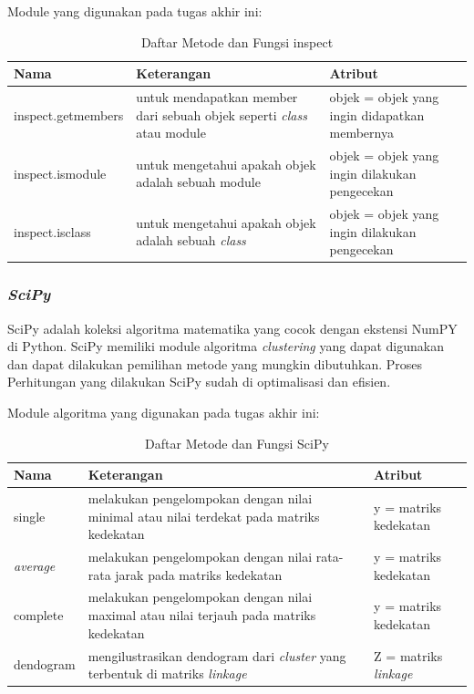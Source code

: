 Module yang digunakan pada tugas akhir ini:
\begingroup
\setlength{\LTleft}{-20cm plus -1fill}
\setlength{\LTright}{\LTleft}
\begin{small}
	\begin{longtable}{|p{3cm}|p{5cm}|p{4.5cm}|}
		\caption{Daftar Metode dan Fungsi inspect}\\
		\hline
		\textbf{Nama} & \textbf{Keterangan} & \textbf{Atribut}\\
		\endfirsthead
		
		\hline
		    inspect.getmembers
		  &  untuk mendapatkan member dari sebuah objek seperti \textit{class} atau module
		  & objek = objek yang ingin didapatkan membernya\\
		\hline 
		    inspect.ismodule
		  & untuk mengetahui apakah objek adalah sebuah module
		  & objek = objek yang ingin dilakukan pengecekan\\
		\hline  
		\hline
		    inspect.isclass
		  & untuk mengetahui apakah objek adalah sebuah \textit{class}
		  & objek = objek yang ingin dilakukan pengecekan\\
		\hline  
	\end{longtable}
\end{small}
\endgroup

\subsubsection{\textit{SciPy} \cite{scipy}}
SciPy adalah koleksi algoritma matematika yang cocok dengan ekstensi NumPY di Python. SciPy memiliki module algoritma \textit{clustering} yang dapat digunakan dan dapat dilakukan pemilihan metode yang mungkin dibutuhkan. Proses Perhitungan yang dilakukan SciPy sudah di optimalisasi dan efisien.

Module algoritma yang digunakan pada tugas akhir ini:
\begingroup
\setlength{\LTleft}{-20cm plus -1fill}
\setlength{\LTright}{\LTleft}
\begin{small}
	\begin{longtable}{|p{3cm}|p{5cm}|p{4.5cm}|}
		\caption{Daftar Metode dan Fungsi SciPy}\\
		\hline
		\textbf{Nama} & \textbf{Keterangan} & \textbf{Atribut}\\
		\endfirsthead
		
		\hline
		 	single
		  & melakukan pengelompokan dengan nilai minimal atau nilai terdekat pada matriks kedekatan
		  & y = matriks kedekatan \\
		\hline  
		 \textit{average}
		  & melakukan pengelompokan dengan nilai rata-rata jarak pada matriks kedekatan
		  & y = matriks kedekatan \\
		\hline  
		complete
		  & melakukan pengelompokan dengan nilai maximal atau nilai terjauh pada matriks kedekatan
		  & y = matriks kedekatan \\
		  \hline  
		dendogram
		  & mengilustrasikan dendogram dari \textit{cluster} yang terbentuk di matriks \textit{linkage}
		  & Z = matriks \textit{linkage}  \\
		\hline  
	\end{longtable}
\end{small}
\endgroup


